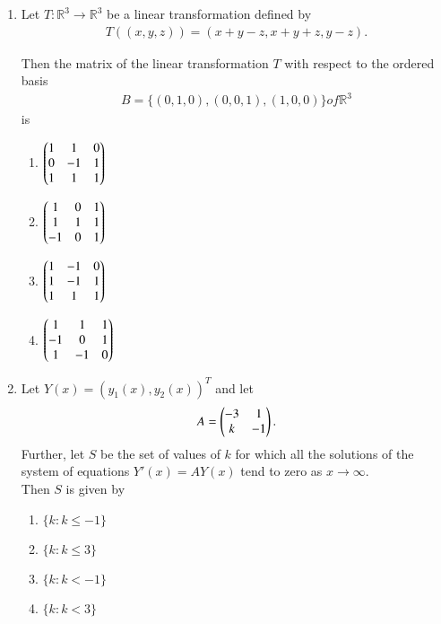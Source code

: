 \documentclass[journal]{IEEEtran}
\numberwithin{equation}{enumi}
\numberwithin{figure}{enumi}
\begin{document}
\begin{enumerate}
\item Let $T:\mathbb{R}^3 \rightarrow \mathbb{R}^3$ be a linear transformation defined by
\begin{align*}
T((x, y, z)) = (x + y - z, x + y + z, y - z).
\end{align*}

Then the matrix of the linear transformation $T$ with respect to the ordered basis
\begin{align*}
    B = \{(0,1,0), (0,0,1), (1,0,0)\} of \mathbb{R}^3
\end{align*}
is \hfill{}

\begin{multicols}{2}
    \begin{enumerate}
        \item $\begin{pmatrix} 1 & 1 & 0 \\ 0 & -1 & 1 \\ 1 & 1 & 1 \end{pmatrix}$
        \item $\begin{pmatrix} 1 & 0 & 1 \\ 1 & 1 & 1 \\ -1 & 0 & 1 \end{pmatrix}$
        \item $\begin{pmatrix} 1 & -1 & 0 \\ 1 & -1 & 1 \\ 1 & 1 & 1  \end{pmatrix}$
        \item $\begin{pmatrix} 1 & 1 & 1 \\ -1 & 0 & 1 \\ 1 & -1 & 0 \end{pmatrix}$ 
    \end{enumerate}
    \end{multicols}


\item Let $Y(x) = (y_1(x), y_2(x))^T$ and let
\begin{align*}
A = \begin{pmatrix} -3 & 1 \\ k & -1 \end{pmatrix}.
\end{align*}
Further, let $S$ be the set of values of $k$ for which all the solutions of the system of equations $Y'(x) = A Y(x)$ tend to zero as $x \rightarrow \infty$. 
\\Then $S$ is given by      \hfill{}
\begin{multicols}{2}
    \begin{enumerate}
        \item $\{k : k \leq -1\}$
        \item $\{k : k \leq 3\}$
        \item $\{k : k < -1\}$
        \item  $\{k : k < 3\}$
    \end{enumerate}
    \end{multicols}



\end{enumerate}
\end{document}
